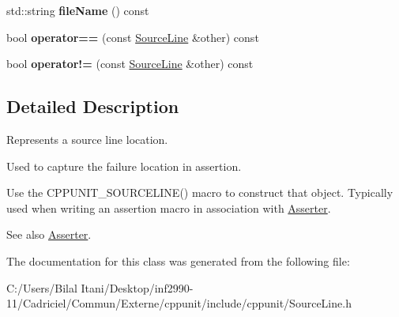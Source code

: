 \begin{DoxyCompactItemize}
\item 
std\+::string {\bfseries file\+Name} () const \hypertarget{class_source_line_a1571a51d45ebcea382b86224ef767a2e}{}\label{class_source_line_a1571a51d45ebcea382b86224ef767a2e}

\item 
bool {\bfseries operator==} (const \hyperlink{class_source_line}{Source\+Line} \&other) const \hypertarget{class_source_line_a6c9eff68161f364725b3a51fc60c3e01}{}\label{class_source_line_a6c9eff68161f364725b3a51fc60c3e01}

\item 
bool {\bfseries operator!=} (const \hyperlink{class_source_line}{Source\+Line} \&other) const \hypertarget{class_source_line_aa4633f46f9c9f470c6b680327d002e86}{}\label{class_source_line_aa4633f46f9c9f470c6b680327d002e86}

\end{DoxyCompactItemize}


\subsection{Detailed Description}
Represents a source line location.

Used to capture the failure location in assertion. 

Use the C\+P\+P\+U\+N\+I\+T\+\_\+\+S\+O\+U\+R\+C\+E\+L\+I\+N\+E() macro to construct that object. Typically used when writing an assertion macro in association with \hyperlink{struct_asserter}{Asserter}.

\begin{DoxySeeAlso}{See also}
\hyperlink{struct_asserter}{Asserter}. 
\end{DoxySeeAlso}


The documentation for this class was generated from the following file\+:\begin{DoxyCompactItemize}
\item 
C\+:/\+Users/\+Bilal Itani/\+Desktop/inf2990-\/11/\+Cadriciel/\+Commun/\+Externe/cppunit/include/cppunit/Source\+Line.\+h\end{DoxyCompactItemize}

